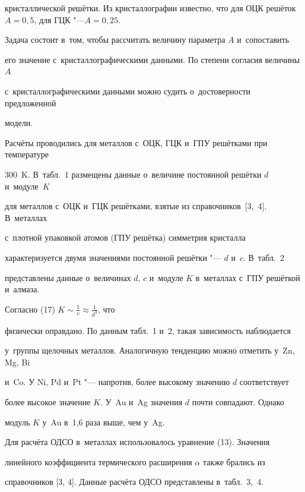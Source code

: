 кристаллической решётки. Из кристаллографии известно, что для ОЦК решёток $A= 0,5$, для ГЦК "---$A = 0,25$.



Задача состоит в~том, чтобы рассчитать величину параметра $A$ и~сопоставить 

его значение с~кристаллографическими данными. По степени согласия величины $A$ 

с~кристаллографическими данными можно судить о~достоверности предложенной 

модели.



Расчёты проводились для металлов с~ОЦК, ГЦК и~ГПУ решётками при температуре 

300~K. В~табл.~1 размещены данные о~величине постоянной решётки $d$ и~модуле~$K$

для металлов с~ОЦК и~ГЦК решётками, взятые из справочников~[3,~4]. В~металлах 

с~плотной упаковкой атомов (ГПУ решётка) симметрия кристалла 

характеризуется двумя значениями постоянной решётки "--- $d$ и~$c$. В~табл.~2 

представлены данные о~величинах $d$, $c$ и~модуле $K$ в~металлах с~ГПУ решёткой и~алмаза.







Согласно (17) $K\sim \frac1\upsilon \approx \frac1{d^3}$, что 

физически оправдано. По данным табл.~1 и~2, такая зависимость наблюдается 

у~группы щелочных металлов. Аналогичную тенденцию можно отметить у~Zn, Mg, Bi 

и~Co. У Ni, Pd и~Pt "--- напротив, более высокому значению $d$ соответствует 

более высокое значение $K$. У~Au и~Ag значения $d$ почти совпадают. Однако 

модуль $K$ у~Au в~1,6 раза выше, чем у~Ag.



Для расчёта ОДСО в~металлах использовалось уравнение (13). Значения 

линейного коэффициента термического расширения $\alpha $ также брались из 

справочников [3, 4]. Данные расчёта ОДСО представлены в~табл.~3,~4.







